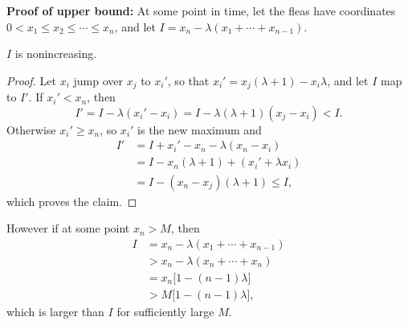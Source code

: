\textbf{Proof of upper bound:} At some point in time, let the fleas have coordinates $0<x_1\le x_2\le\cdots\le x_n$, and let $I=x_n-\lambda(x_1+\cdots+x_{n-1})$.
\begin{claim*}
    $I$ is nonincreasing.
\end{claim*}
\begin{proof}
    Let $x_i$ jump over $x_j$ to $x_i'$, so that $x_i'=x_j(\lambda+1)-x_i\lambda$, and let $I$ map to $I'$. If $x_i'<x_n$, then \[I'=I-\lambda(x_i'-x_i)=I-\lambda(\lambda+1)(x_j-x_i)<I.\]
    Otherwise $x_i'\ge x_n$, so $x_i'$ is the new maximum and
    \begin{align*}
        I'&=I+x_i'-x_n-\lambda(x_n-x_i)\\
        &=I-x_n(\lambda+1)+(x_i'+\lambda x_i)\\
        &=I-(x_n-x_j)(\lambda+1)\le I,
    \end{align*}
    which proves the claim.
\end{proof}

However if at some point $x_n>M$, then
\begin{align*}
I&=x_n-\lambda(x_1+\cdots+x_{n-1})\\
&>x_n-\lambda(x_n+\cdots+x_n)\\
&=x_n\big[1-(n-1)\lambda\big]\\
&>M\big[1-(n-1)\lambda\big],
\end{align*}
which is larger than $I$ for sufficiently large $M$.
